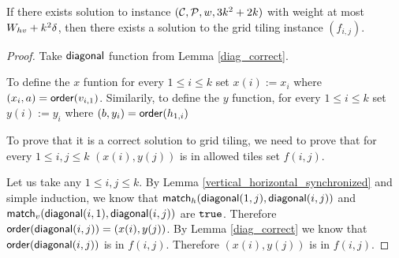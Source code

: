 \begin{lemma}
\label{grid_tiling_exists}
	If there exists solution to instance $(\mathcal{C}, \mathcal{P}, w, 3k^2+2k)$
	with weight at most $W_{hv} +k^2\delta$,
	then there exists a solution to the grid tiling instance $(f_{i,j})$.
\end{lemma}

\begin{proof}
Take $\mathsf{diagonal}$ function from Lemma \ref{diag_correct}.

To define the $x$ funtion 
for every $1 \le i \le k$ set $x(i) := x_i$
where $(x_i, a) = \mathsf{order}(v_{i,1})$.
Similarily, to define the $y$ function,
for every $1 \le i \le k$ set $y(i) := y_i$
where $(b, y_i) = \mathsf{order}(h_{1,i})$

To prove that it is a correct solution to grid tiling,
we need to prove that 
for every $1 \le i,j \le k$ $(x(i), y(j))$ is in
allowed tiles set $f(i,j)$.

Let us take any $1 \le i,j \le k$.
By Lemma \ref{vertical_horizontal_synchronized}
and simple induction,
we know that $\mathsf{match}_h(\mathsf{diagonal}(1, j),\mathsf{diagonal}(i, j))$ and
$\mathsf{match}_v(\mathsf{diagonal}(i, 1),\mathsf{diagonal}(i, j))$ are $\texttt{true}$.
Therefore $\mathsf{order}(\mathsf{diagonal}(i,j)) = (x(i), y(j))$.
By Lemma \ref{diag_correct} we know that 
$\mathsf{order}(\mathsf{diagonal}(i,j))$ is in $f(i,j)$.
Therefore 
$(x(i), y(j))$
is in $f(i,j)$.
\end{proof}


